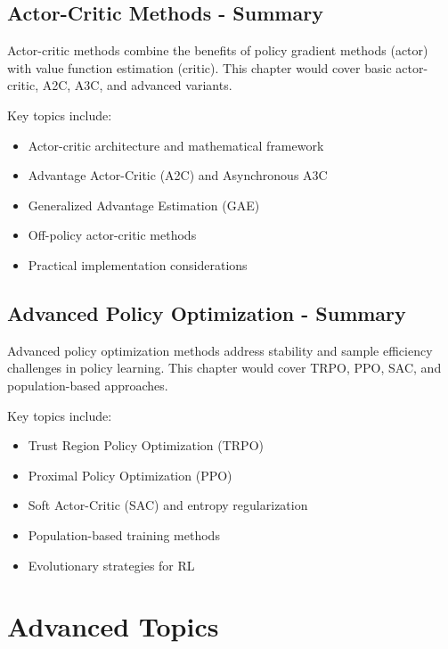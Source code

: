 \documentclass[11pt,twoside,openright]{book}
\begin{document}
\chapter{Actor-Critic Methods - Summary}
\label{ch:actor-critic-summary}

\begin{keyideabox}
Actor-critic methods combine the benefits of policy gradient methods (actor) with value function estimation (critic). This chapter would cover basic actor-critic, A2C, A3C, and advanced variants.
\end{keyideabox}

Key topics include:
\begin{itemize}
\item Actor-critic architecture and mathematical framework
\item Advantage Actor-Critic (A2C) and Asynchronous A3C
\item Generalized Advantage Estimation (GAE)
\item Off-policy actor-critic methods
\item Practical implementation considerations
\end{itemize}

\chapter{Advanced Policy Optimization - Summary}
\label{ch:advanced-policy-summary}

\begin{keyideabox}
Advanced policy optimization methods address stability and sample efficiency challenges in policy learning. This chapter would cover TRPO, PPO, SAC, and population-based approaches.
\end{keyideabox}

Key topics include:
\begin{itemize}
\item Trust Region Policy Optimization (TRPO)
\item Proximal Policy Optimization (PPO)
\item Soft Actor-Critic (SAC) and entropy regularization
\item Population-based training methods
\item Evolutionary strategies for RL
\end{itemize}

\part{Advanced Topics}
\end{document}
